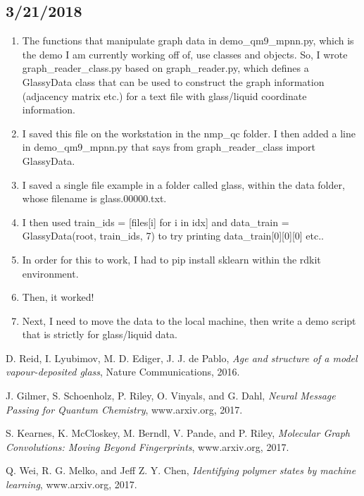 \documentclass[12pt,reqno]{amsart}
\numberwithin{equation}{section}
\begin{document}
\subsection{3/21/2018}

\begin{enumerate}
\item The functions that manipulate graph data in demo\_qm9\_mpnn.py, which is the demo I am currently working off of, use classes and objects.  So, I wrote graph\_reader\_class.py based on graph\_reader.py, which defines a GlassyData class that can be used to construct the graph information (adjacency matrix etc.) for a text file with glass/liquid coordinate information.  
\item I saved this file on the workstation in the nmp\_qc folder.  I then added a line in demo\_qm9\_mpnn.py that says from graph\_reader\_class import GlassyData.  
\item I saved a single file example in a folder called glass, within the data folder, whose filename is glass.00000.txt.  
\item I then used train\_ids = [files[i] for i in idx] and data\_train = GlassyData(root, train\_ids, 7) to try printing data\_train[0][0][0] etc..
\item In order for this to work, I had to pip install sklearn within the rdkit environment.
\item Then, it worked! 
\item Next, I need to move the data to the local machine, then write a demo script that is strictly for glass/liquid data.  
\end{enumerate}




\begin{thebibliography}{Al-F11}
D. Reid, I. Lyubimov, M. D. Ediger, J. J. de Pablo, \textit{Age and structure of a model vapour-deposited glass}, Nature Communications, 2016. 

 J. Gilmer, S. Schoenholz, P. Riley, O. Vinyals, and G. Dahl, \textit{Neural Message Passing for Quantum Chemistry}, www.arxiv.org, 2017.  

S. Kearnes, K. McCloskey, M. Berndl, V. Pande, and P. Riley, \textit{Molecular Graph Convolutions: Moving Beyond Fingerprints}, www.arxiv.org, 2017.

Q. Wei, R. G. Melko, and Jeff Z. Y. Chen, \textit{Identifying polymer states by machine learning}, www.arxiv.org, 2017.  

\end{thebibliography}
\end{document}
